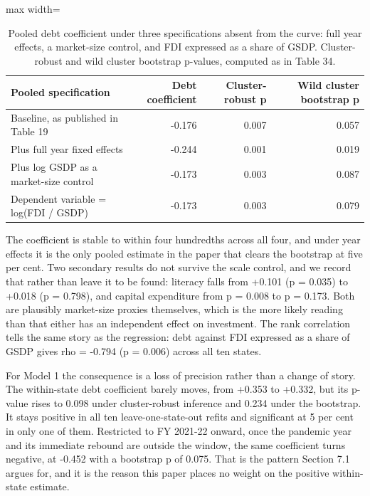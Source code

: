 \documentclass[12pt,a4paper]{article}
\begin{document}
\begin{table}[H]
\centering
\addtocounter{table}{-1}\renewcommand{\thetable}{\arabic{table}c}
\caption{Pooled debt coefficient under three specifications absent from the curve: full year effects, a market-size control, and FDI expressed as a share of GSDP. Cluster-robust and wild cluster bootstrap p-values, computed as in Table 34.}
\label{tab:23c}
\renewcommand{\thetable}{\arabic{table}}
\footnotesize
\begin{adjustbox}{max width=\textwidth}
\begin{tabular}{@{}lrrr@{}}
\toprule
Pooled specification & Debt coefficient & Cluster-robust p & Wild cluster bootstrap p \\
\midrule
Baseline, as published in Table 19 & -0.176 & 0.007 & 0.057 \\
Plus full year fixed effects & -0.244 & 0.001 & 0.019 \\
Plus log GSDP as a market-size control & -0.173 & 0.003 & 0.087 \\
Dependent variable = log(FDI / GSDP) & -0.173 & 0.003 & 0.079 \\
\bottomrule
\end{tabular}
\end{adjustbox}
\end{table}

The coefficient is stable to within four hundredths across all four, and under year effects it is the only pooled estimate in the paper that clears the bootstrap at five per cent. Two secondary results do not survive the scale control, and we record that rather than leave it to be found: literacy falls from +0.101 (p = 0.035) to +0.018 (p = 0.798), and capital expenditure from p = 0.008 to p = 0.173. Both are plausibly market-size proxies themselves, which is the more likely reading than that either has an independent effect on investment. The rank correlation tells the same story as the regression: debt against FDI expressed as a share of GSDP gives rho = -0.794 (p = 0.006) across all ten states.

For Model 1 the consequence is a loss of precision rather than a change of story. The within-state debt coefficient barely moves, from +0.353 to +0.332, but its p-value rises to 0.098 under cluster-robust inference and 0.234 under the bootstrap. It stays positive in all ten leave-one-state-out refits and significant at 5 per cent in only one of them. Restricted to FY 2021-22 onward, once the pandemic year and its immediate rebound are outside the window, the same coefficient turns negative, at -0.452 with a bootstrap p of 0.075. That is the pattern Section 7.1 argues for, and it is the reason this paper places no weight on the positive within-state estimate.
\end{document}
